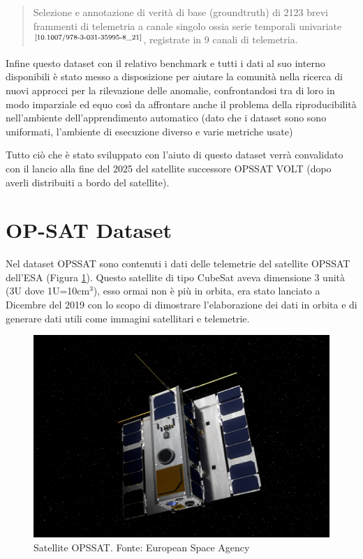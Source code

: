 \begin{quote}
    Selezione e annotazione di verità di base (ground\textunderscore truth) di 2123 brevi frammenti di telemetria a canale singolo ossia serie temporali univariate$^{\text{\cite{10.1007/978-3-031-35995-8_21}}}$, registrate in 9 canali di telemetria.
\end{quote}

Infine questo dataset con il relativo benchmark e tutti i dati al suo interno disponibili è stato messo a disposizione per aiutare la comunità nella ricerca di nuovi approcci per la rilevazione delle anomalie, confrontandosi tra di loro in modo imparziale ed equo così da affrontare anche il problema della riproducibilità nell'ambiente dell'apprendimento automatico (dato che i dataset sono sono uniformati, l'ambiente di esecuzione diverso e varie metriche usate) 

Tutto ciò che è stato sviluppato con l'aiuto di questo dataset verrà convalidato con il lancio alla fine del 2025 del satellite successore OPS\textunderscore SAT VOLT (dopo averli distribuiti a bordo del satellite).


\section{OP-SAT Dataset}
Nel dataset OPS\textunderscore SAT sono contenuti i dati delle telemetrie del satellite OPS\textunderscore SAT dell'ESA (Figura \ref{fig:OP-SAT_satellite}). Questo satellite di tipo CubeSat aveva dimensione 3 unità (3U dove 1U=10cm$^3$), esso ormai non è più in orbita, era stato lanciato a Dicembre del 2019 con lo scopo di dimostrare l'elaborazione dei dati in orbita e di generare dati utili come immagini satellitari e telemetrie.

\begin{figure}[h]
    \centering
    \includegraphics[width=0.5\linewidth]{images/Capitolo2/OP-SAT_satellite.png}
    \caption{Satellite OPS\textunderscore SAT. Fonte: European Space Agency}
    \label{fig:OP-SAT_satellite}
\end{figure}

